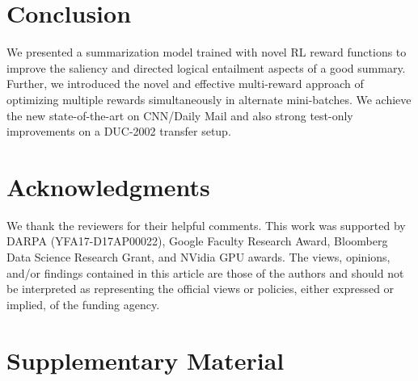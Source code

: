 \documentclass[11pt,a4paper]{article}
\begin{document}
\section{Conclusion}
We presented a summarization model trained with novel RL reward functions to improve the saliency and directed logical entailment aspects of a good summary. Further, we introduced the novel and effective multi-reward approach of optimizing multiple rewards simultaneously in alternate mini-batches. We achieve the new state-of-the-art on CNN/Daily Mail and also strong test-only improvements on a DUC-2002 transfer setup.

\section*{Acknowledgments}
We thank the reviewers for their helpful comments. This work was supported by DARPA (YFA17-D17AP00022), Google Faculty Research Award, Bloomberg Data Science Research Grant, and NVidia GPU awards. The views, opinions, and/or findings contained in this article are those of the authors and should not be interpreted as representing the official views or policies, either expressed or implied, of the funding agency.




\appendix
\section{Supplementary Material}
\end{document}
